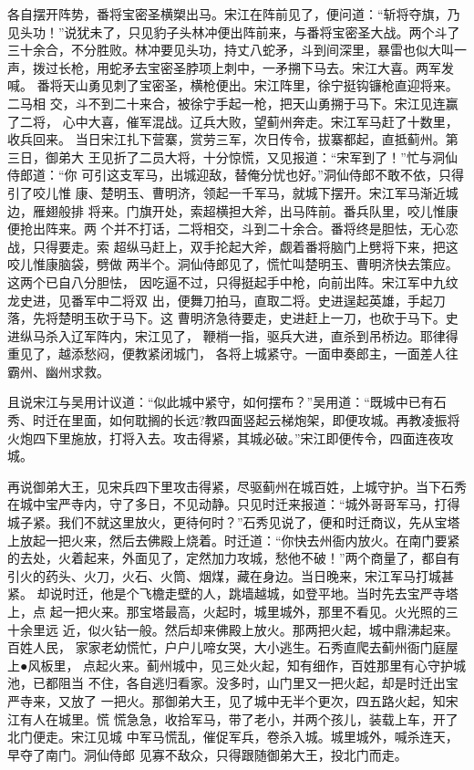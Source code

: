 各自摆开阵势，番将宝密圣横槊出马。宋江在阵前见了，便问道：“斩将夺旗，乃
见头功！”说犹未了，只见豹子头林冲便出阵前来，与番将宝密圣大战。两个斗了
三十余合，不分胜败。林冲要见头功，持丈八蛇矛，斗到间深里，暴雷也似大叫一
声，拨过长枪，用蛇矛去宝密圣脖项上刺中，一矛搠下马去。宋江大喜。两军发喊。
番将天山勇见刺了宝密圣，横枪便出。宋江阵里，徐宁挺钩镰枪直迎将来。二马相
交，斗不到二十来合，被徐宁手起一枪，把天山勇搠于马下。宋江见连赢了二将，
心中大喜，催军混战。辽兵大败，望蓟州奔走。宋江军马赶了十数里，收兵回来。
当日宋江扎下营寨，赏劳三军，次日传令，拔寨都起，直抵蓟州。第三日，御弟大
王见折了二员大将，十分惊慌，又见报道：“宋军到了！”忙与洞仙侍郎道：“你
可引这支军马，出城迎敌，替俺分忧也好。”洞仙侍郎不敢不依，只得引了咬儿惟
康、楚明玉、曹明济，领起一千军马，就城下摆开。宋江军马渐近城边，雁翅般排
将来。门旗开处，索超横担大斧，出马阵前。番兵队里，咬儿惟康便抢出阵来。两
个并不打话，二将相交，斗到二十余合。番将终是胆怯，无心恋战，只得要走。索
超纵马赶上，双手抡起大斧，觑着番将脑门上劈将下来，把这咬儿惟康脑袋，劈做
两半个。洞仙侍郎见了，慌忙叫楚明玉、曹明济快去策应。这两个已自八分胆怯，
因吃逼不过，只得挺起手中枪，向前出阵。宋江军中九纹龙史进，见番军中二将双
出，便舞刀拍马，直取二将。史进逞起英雄，手起刀落，先将楚明玉砍于马下。这
曹明济急待要走，史进赶上一刀，也砍于马下。史进纵马杀入辽军阵内，宋江见了，
鞭梢一指，驱兵大进，直杀到吊桥边。耶律得重见了，越添愁闷，便教紧闭城门，
各将上城紧守。一面申奏郎主，一面差人往霸州、幽州求救。

且说宋江与吴用计议道：“似此城中紧守，如何摆布？”吴用道：“既城中已有石
秀、时迁在里面，如何耽搁的长远?教四面竖起云梯炮架，即便攻城。再教凌振将
火炮四下里施放，打将入去。攻击得紧，其城必破。”宋江即便传令，四面连夜攻
城。

再说御弟大王，见宋兵四下里攻击得紧，尽驱蓟州在城百姓，上城守护。当下石秀
在城中宝严寺内，守了多日，不见动静。只见时迁来报道：“城外哥哥军马，打得
城子紧。我们不就这里放火，更待何时？”石秀见说了，便和时迁商议，先从宝塔
上放起一把火来，然后去佛殿上烧着。时迁道：“你快去州衙内放火。在南门要紧
的去处，火着起来，外面见了，定然加力攻城，愁他不破！”两个商量了，都自有
引火的药头、火刀，火石、火筒、烟煤，藏在身边。当日晚来，宋江军马打城甚紧。
却说时迁，他是个飞檐走壁的人，跳墙越城，如登平地。当时先去宝严寺塔上，点
起一把火来。那宝塔最高，火起时，城里城外，那里不看见。火光照的三十余里远
近，似火钻一般。然后却来佛殿上放火。那两把火起，城中鼎沸起来。百姓人民，
家家老幼慌忙，户户儿啼女哭，大小逃生。石秀直爬去蓟州衙门庭屋上●风板里，
点起火来。蓟州城中，见三处火起，知有细作，百姓那里有心守护城池，已都阻当
不住，各自逃归看家。没多时，山门里又一把火起，却是时迁出宝严寺来，又放了
一把火。那御弟大王，见了城中无半个更次，四五路火起，知宋江有人在城里。慌
慌急急，收拾军马，带了老小，并两个孩儿，装载上车，开了北门便走。宋江见城
中军马慌乱，催促军兵，卷杀入城。城里城外，喊杀连天，早夺了南门。洞仙侍郎
见寡不敌众，只得跟随御弟大王，投北门而走。

